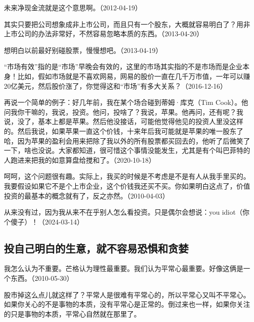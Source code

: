 未来净现金流就是这个意思啊。（2012-04-19）

其实只要把公司想象成非上市公司，而且只有一个股东，大概就容易明白了？用非上市公司的办法非常好，不然容易忽略本质的东西。（2013-04-20）

想明白以前最好别碰股票，慢慢想吧。（2013-04-19）

“市场有效”指的是“市场”早晚会有效的，这里的市场其实指的不是市场而是企业本身！比如，假如市场就是不喜欢网易，网易的股价一直在几千万市值，一年可以赚20亿美元，然后股价涨了，你觉得这和“市场”有多大关系？（2016-12-16）

再说一个简单的例子：好几年前，我在某个场合碰到蒂姆·库克（Tim Cook）。他问我你干嘛的，我说，投资。他问，投啥了？我说，苹果。他再问，还有呢？我说，没了，基本上都是苹果。然后他没接话，可能他觉得他见的投资人里没这样的。然后我说，如果苹果一直这个价钱，十来年后我可能就是苹果的唯一股东了哈，因为苹果的盈利会用来把除了我以外的所有股票都买回去的，他听了后微笑了一下，啥也没说。大家都知道，很可惜这个事情没能发生，尤其是有个叫巴菲特的人跑进来把我的如意算盘给搅和了。（2020-10-18）


呵呵，这个问题很有趣。实际上，我买的时候是不考虑是不是有人从我手里买的。我要假设如果它不是个上市企业，这个价钱我还买不买。你如果明白这点了，价值投资的最基本的概念就有了，反之亦然。（2010-04-03）


从来没有过，因为我从来不在乎别人怎么看投资。只是偶尔会想说：you idiot（你个傻子）！（2024-03-14）

\subsection{投自己明白的生意，就不容易恐惧和贪婪}


我怎么认为不重要。芒格认为理性最重要。我们认为平常心最重要。好像这俩是一个东西。（2010-05-30）


股市掉这么点儿就这样了？平常人是很难有平常心的，所以平常心又叫不平常心。如果你关心的不是事物的本质，没有平常心是正常的。倒过来也一样，如果你关注的只是事物的本质，平常心自然就在那里了。

